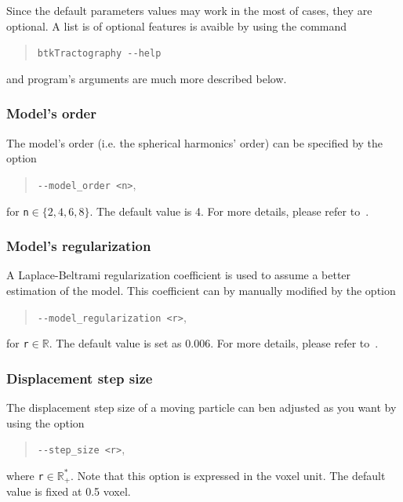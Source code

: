         Since the default parameters values may work in the most of cases, they are optional. A list is of optional features is avaible by using the command
            \begin{quote}
                \texttt{btkTractography -\hspace{0.1mm}-help}
            \end{quote}
        and program's arguments are much more described below.


    \subsubsection*{Model's order}
        The model's order (i.e. the spherical harmonics' order) can be specified by the option
            \begin{quote}
                \texttt{-\hspace{0.1mm}-model_order <n>},
            \end{quote}
        for \texttt{n}$\in\{2,4,6,8\}$. The default value is 4. For more details, please refer to~\cite{descoteaux_regularized_2007}.

    \subsubsection*{Model's regularization}
        A Laplace-Beltrami regularization coefficient is used to assume a better estimation of the model. This coefficient can by manually modified by the option
            \begin{quote}
                \texttt{-\hspace{0.1mm}-model_regularization <r>},
            \end{quote}
        for \texttt{r}$\in\mathbb{R}$. The default value is set as 0.006. For more details, please refer to~\cite{descoteaux_regularized_2007}.

    \subsubsection*{Displacement step size}
        The displacement step size of a moving particle can ben adjusted as you want by using the option
            \begin{quote}
                \texttt{-\hspace{0.1mm}-step_size <r>},
            \end{quote}
        where \texttt{r}$\in\mathbb{R}_+^*$. Note that this option is expressed in the voxel unit. The default value is fixed at 0.5 voxel.

